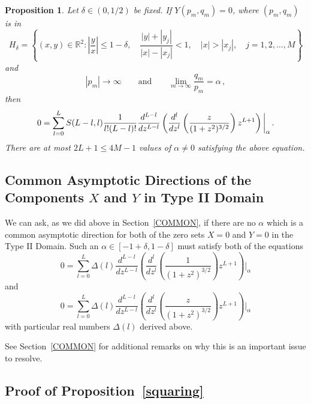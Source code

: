 \documentclass{article}
\newtheorem{prop}[thm]{Proposition}
\theoremstyle{remark}
\numberwithin{equation}{section}
\begin{document}
\begin{prop}\label{GenYTypeII} Let $\delta \in (0,1/2)$ be fixed. If $Y(p_m,q_m) = 0$, where $(p_m,q_m)$ is in
$$H_{\delta} = \left\{(x,y) \in {\mathbb R}^2: \left| \frac yx \right| \leq 1-\delta, \quad \frac{|y|+|y_j|}{|x|-|x_j|} < 1, \quad |x| > |x_j|, \quad j=1,2,\ldots,M \right\}$$
and
$$|p_m| \rightarrow \infty \qquad \text{and} \qquad \lim_{m \rightarrow \infty}{\frac{q_m}{p_m}} = \alpha\,,$$
then
\begin{equation} \notag
0 = \sum_{l=0}^L S(L-l,l) \frac {1}{l!(L-l)!} 
\frac{d^{L-l}}{dz^{L-l}} \left( \frac{d^l}{dz^l} \left( \frac{z}{(1 +z^2)^{3/2}} \right)z^{L+1} \right)\bigg |_\alpha\,.
\end{equation}
There are at most $2L+1 \leq 4M-1$ values of $\alpha \neq 0$ satisfying the above equation.
\end{prop}

\subsection{Common Asymptotic Directions of the Components $X$ and $Y$ in Type II Domain}\label{SAME}

We can ask, as we did above in Section~\ref{COMMON}, if there are no $\alpha$ which is a common asymptotic direction for both of the zero sets $X=0$ and $Y=0$ 
in the Type II Domain. Such an $\alpha \in [-1+\delta,1-\delta]$ must satisfy both of the equations
$$0 = \sum_{l=0}^L \Delta(l) \frac{d^{L-l}}{dz^{L-l}} \left( \frac{d^l}{dz^l} \left( \frac{1}{(1 +z^2)^{3/2}} \right)z^{L+1} \right)\bigg |_\alpha$$
and
$$0 = \sum_{l=0}^L \Delta(l) \frac{d^{L-l}}{dz^{L-l}} \left( \frac{d^l}{dz^l} \left( \frac{z}{(1 +z^2)^{3/2}} \right)z^{L+1} \right)\bigg |_\alpha$$
with particular real numbers $\Delta(l)$ derived above.

See Section~\ref{COMMON} for additional remarks on why this is an important issue to resolve.

\subsection{Proof of Proposition~\ref{squaring}}  
\end{document}
